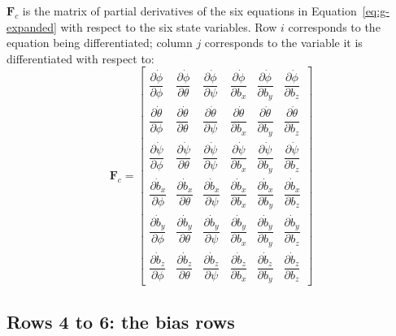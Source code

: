 \documentclass[12pt,a4paper]{article}
\newcommand{\bF}{\bm{F}}
\begin{document}
{$\bF_c$ is the matrix of partial derivatives of the six equations in
Equation~\eqref{eq:g-expanded} with respect to the six state variables.
Row $i$ corresponds to the equation being differentiated; column $j$
corresponds to the variable it is differentiated with respect to:
\begin{equation}
  \bF_c =
  \begin{bmatrix}
    \dfrac{\partial \dot\phi}{\partial \phi}   & \dfrac{\partial \dot\phi}{\partial \theta}   & \dfrac{\partial \dot\phi}{\partial \psi}   & \dfrac{\partial \dot\phi}{\partial b_x}   & \dfrac{\partial \dot\phi}{\partial b_y}   & \dfrac{\partial \dot\phi}{\partial b_z}   \\[6pt]
    \dfrac{\partial \dot\theta}{\partial \phi} & \dfrac{\partial \dot\theta}{\partial \theta} & \dfrac{\partial \dot\theta}{\partial \psi} & \dfrac{\partial \dot\theta}{\partial b_x} & \dfrac{\partial \dot\theta}{\partial b_y} & \dfrac{\partial \dot\theta}{\partial b_z} \\[6pt]
    \dfrac{\partial \dot\psi}{\partial \phi}   & \dfrac{\partial \dot\psi}{\partial \theta}   & \dfrac{\partial \dot\psi}{\partial \psi}   & \dfrac{\partial \dot\psi}{\partial b_x}   & \dfrac{\partial \dot\psi}{\partial b_y}   & \dfrac{\partial \dot\psi}{\partial b_z}   \\[6pt]
    \dfrac{\partial \dot{b}_x}{\partial \phi}  & \dfrac{\partial \dot{b}_x}{\partial \theta}  & \dfrac{\partial \dot{b}_x}{\partial \psi}  & \dfrac{\partial \dot{b}_x}{\partial b_x}  & \dfrac{\partial \dot{b}_x}{\partial b_y}  & \dfrac{\partial \dot{b}_x}{\partial b_z}  \\[6pt]
    \dfrac{\partial \dot{b}_y}{\partial \phi}  & \dfrac{\partial \dot{b}_y}{\partial \theta}  & \dfrac{\partial \dot{b}_y}{\partial \psi}  & \dfrac{\partial \dot{b}_y}{\partial b_x}  & \dfrac{\partial \dot{b}_y}{\partial b_y}  & \dfrac{\partial \dot{b}_y}{\partial b_z}  \\[6pt]
    \dfrac{\partial \dot{b}_z}{\partial \phi}  & \dfrac{\partial \dot{b}_z}{\partial \theta}  & \dfrac{\partial \dot{b}_z}{\partial \psi}  & \dfrac{\partial \dot{b}_z}{\partial b_x}  & \dfrac{\partial \dot{b}_z}{\partial b_y}  & \dfrac{\partial \dot{b}_z}{\partial b_z}
  \end{bmatrix}
  \label{eq:Fc-generic}
\end{equation}

\subsection{Rows 4 to 6: the bias rows}

}
\end{document}
